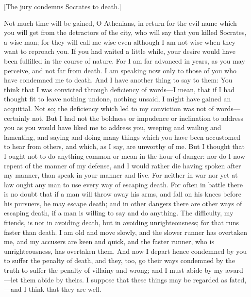 \documentclass[12pt]{article}
\begin{document}
\begin{center}
[The jury condemns Socrates to death.]
\end{center}

\noindent Not much time will be gained, O Athenians, in return for the evil
name which you will get from the detractors of the city, who will
say that you killed Socrates, a wise man; for they will call me wise
even although I am not wise when they want to reproach you. If you
had waited a little while, your desire would have been fulfilled in
the course of nature. For I am far advanced in years, as you may perceive,
and not far from death. I am speaking now only to those of you who
have condemned me to death. And I have another thing to say to them:
You think that I was convicted through deficiency of words---I mean,
that if I had thought fit to leave nothing undone, nothing unsaid,
I might have gained an acquittal. Not so; the deficiency which led
to my conviction was not of words---certainly not. But I had not the
boldness or impudence or inclination to address you as you would have
liked me to address you, weeping and wailing and lamenting, and saying
and doing many things which you have been accustomed to hear from
others, and which, as I say, are unworthy of me. But I thought that
I ought not to do anything common or mean in the hour of danger: nor
do I now repent of the manner of my defense, and I would rather die
having spoken after my manner, than speak in your manner and live.
For neither in war nor yet at law ought any man to use every way of
escaping death. For often in battle there is no doubt that if a man
will throw away his arms, and fall on his knees before his pursuers,
he may escape death; and in other dangers there are other ways of
escaping death, if a man is willing to say and do anything. The difficulty,
my friends, is not in avoiding death, but in avoiding unrighteousness;
for that runs faster than death. I am old and move slowly, and the
slower runner has overtaken me, and my accusers are keen and quick,
and the faster runner, who is unrighteousness, has overtaken them.
And now I depart hence condemned by you to suffer the penalty of death,
and they, too, go their ways condemned by the truth to suffer the
penalty of villainy and wrong; and I must abide by my award---let
them abide by theirs. I suppose that these things may be regarded
as fated,---and I think that they are well.
\end{document}
